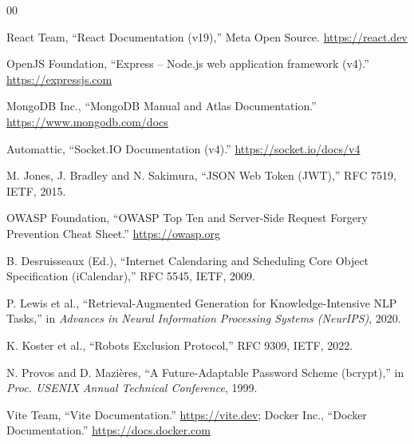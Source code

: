 \documentclass[12pt,a4paper]{report}
\begin{document}
\clearpage
{}

\begin{thebibliography}{00}

React Team, ``React Documentation (v19),'' Meta Open Source. \url{https://react.dev}

OpenJS Foundation, ``Express -- Node.js web application framework (v4).'' \url{https://expressjs.com}

MongoDB Inc., ``MongoDB Manual and Atlas Documentation.'' \url{https://www.mongodb.com/docs}

Automattic, ``Socket.IO Documentation (v4).'' \url{https://socket.io/docs/v4}

M. Jones, J. Bradley and N. Sakimura, ``JSON Web Token (JWT),'' RFC 7519, IETF, 2015.

OWASP Foundation, ``OWASP Top Ten and Server-Side Request Forgery Prevention Cheat Sheet.'' \url{https://owasp.org}

B. Desruisseaux (Ed.), ``Internet Calendaring and Scheduling Core Object Specification (iCalendar),'' RFC 5545, IETF, 2009.

P. Lewis et al., ``Retrieval-Augmented Generation for Knowledge-Intensive NLP Tasks,'' in \emph{Advances in Neural Information Processing Systems (NeurIPS)}, 2020.

K. Koster et al., ``Robots Exclusion Protocol,'' RFC 9309, IETF, 2022.

N. Provos and D. Mazi\`eres, ``A Future-Adaptable Password Scheme (bcrypt),'' in \emph{Proc. USENIX Annual Technical Conference}, 1999.

Vite Team, ``Vite Documentation.'' \url{https://vite.dev}; Docker Inc., ``Docker Documentation.'' \url{https://docs.docker.com}

\end{thebibliography}
\end{document}
